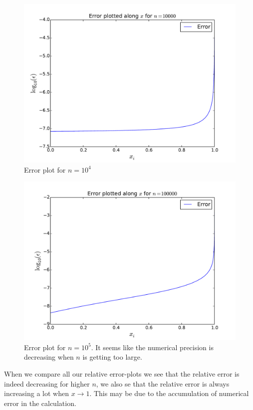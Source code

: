 \documentclass[english, 11pt]{article}
\begin{document}
\begin{figure}[H]
    \centering
    \includegraphics[width = .9\textwidth]{error_n_10000.pdf}
    \caption{Error plot for $n=10^4$}
    \label{fig:en104}
\end{figure}

\begin{figure}[H]
    \centering
    \includegraphics[width = .9\textwidth]{error_n_100000.pdf}
    \caption{Error plot for $n=10^5$. It seems like the numerical precision is decreasing when $n$ is getting too large.}
    \label{fig:en105}
\end{figure}

When we compare all our relative error-plots we see that the relative error is indeed decreasing for higher $n$, we also se that the relative error is always increasing a lot when $x\rightarrow 1$. This may be due to the accumulation of numerical error in the calculation.
\end{document}
